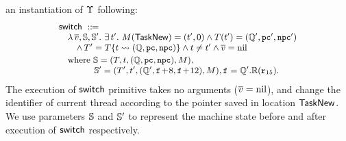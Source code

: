 an instantiation of $\Upsilon$ following: 
\[
    \small
    \begin{array}{l}
        \primsw \ \define \\
        \quad 
        \lambda \, \args{\val}, \hpstate, \hpstate'. \ 
        \exists \, \thrdid'. \ 
        \Mem(\TaskNew) = (\thrdid', 0) \land 
        \thrdpool(\thrdid') = 
            (\hRstate', \pc', \npc') \\
        \qquad
        \land \,
        \thrdpool' = \thrdpool\{ \thrdid \rightsquigarrow 
            (\hRstate, \pc, \npc) \} 
            \land \tid \neq \tid' \land \args{\val} = \nil \\
        \\[-9pt]
        \quad \text{where} \ 
        \hpstate = 
            (\thrdpool, \thrdid, (\hRstate, \pc, \npc), \Mem), \\
        \qquad\qquad
        \hpstate' = 
            (\thrdpool', \thrdid', 
                (\hRstate', \lab{}\!+\!8, \lab{}\!+\!12), \Mem), 
                \lab{} = \hRstate'.\hRfile(\reg{15}). 
    \end{array}
\]
The execution of $\mathsf{switch}{}$ primitive takes no arguments 
($\overline{v} = \text{nil}$), and change the identifier 
of current thread according to the pointer saved 
in location $\mathsf{TaskNew}$. We use parameters $\mathbb{S}$ 
and $\mathbb{S}'$ to represent the machine state before 
and after execution of $\mathsf{switch}{}$ respectively. 

